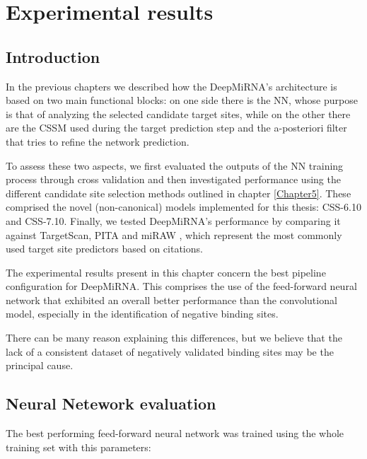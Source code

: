 
\chapter{Experimental results} %

\label{Chapter6} %

\section{Introduction}
In the previous chapters we described how the DeepMiRNA's architecture is based on two main functional blocks: on one side there is the NN, whose purpose is that of analyzing the selected candidate target sites, while on the other there are the CSSM used during the target prediction step and the a-posteriori filter that tries to refine the network prediction. 

To assess these two aspects, we first evaluated the outputs of the NN training process through cross validation and then investigated performance using the different candidate site selection methods outlined in chapter \ref{Chapter5}. These comprised the novel (non-canonical) models implemented for this thesis: CSS-6.10 and CSS-7.10. Finally, we tested DeepMiRNA’s performance by comparing it against TargetScan\cite{targetscan}, PITA\cite{accessibility_nrg_role} and miRAW \cite{miraw}, which represent the most commonly used target site predictors based on citations.

The experimental results present in this chapter concern the best pipeline configuration for DeepMiRNA. This comprises the use of the feed-forward neural network that exhibited an overall better performance than the convolutional model, especially in the identification of negative binding sites. 

There can be many reason explaining this differences, but we believe that the lack of a consistent dataset of negatively validated binding sites may be the principal cause. 

\section{Neural Netework evaluation}
The best performing feed-forward neural network was trained using the whole training set with this parameters:

